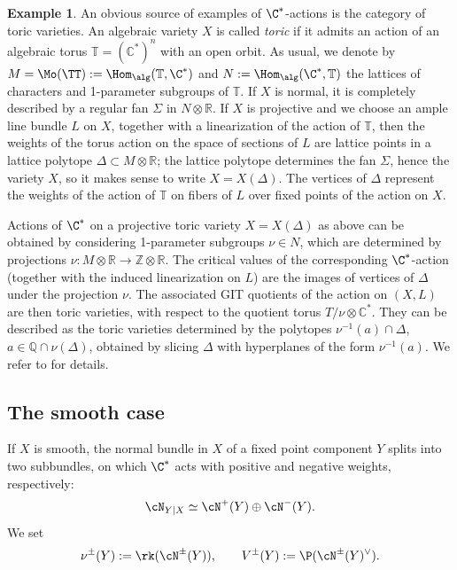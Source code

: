 \documentclass[reqno]{amsproc}
\theoremstyle{definition}
\newtheorem{example}[theorem]{Example}
\begin{document}
\begin{example}\label{wors6:ex:toric}
An obvious source of examples of $\C^*$-actions is the category of toric varieties. An algebraic variety $X$ is called {\em toric} if it admits an action of an algebraic torus $\mathbb{T}=(\mathbb{C}^*)^n$ with an open orbit. As usual, we denote by $M=\Mo(\TT):=\Hom_{\alg}(\mathbb{T},\C^*)$ and $N:=\Hom_{\alg}(\C^*,\mathbb{T})$ the lattices of characters and 1-parameter subgroups of $\mathbb{T}$. If $X$ is normal, it is completely described by a regular fan $\Sigma$ in $N\otimes\mathbb{R}$.  
If $X$ is projective and we choose an ample line bundle $L$ on $X$, together with a linearization of the action of $\mathbb{T}$, then the weights of the torus action on the space of sections of $L$ are lattice points in a lattice polytope $\Delta\subset M\otimes\mathbb{R}$; the lattice polytope determines the fan $\Sigma$, hence the variety $X$, so it makes sense to write $X=X(\Delta)$. The vertices of $\Delta$ represent the weights of the action of $\mathbb{T}$ on fibers of $L$ over fixed points of the action on $X$. 
  
Actions of $\C^*$ on a projective toric variety $X=X(\Delta)$ as above can be  obtained by considering 1-parameter subgroups $\nu\in N$, which are determined by projections $\nu: M\otimes\mathbb{R}\rightarrow\mathbb{Z}\otimes\mathbb{R}$. The critical values of the corresponding $\C^*$-action (together with the induced linearization on $L$) are the images of vertices of $\Delta$ under the projection $\nu$. The associated GIT quotients of the action on $(X,L)$ are then toric varieties, with respect to the quotient torus $T/\nu\otimes\mathbb{C}^*$. They can be described as the toric varieties determined by the polytopes $\nu^{-1}(a)\cap\Delta$, $a\in\mathbb{Q}\cap\nu(\Delta)$, obtained by slicing $\Delta$ with hyperplanes of the form $\nu^{-1}(a)$. We refer to \cite{wors6-KSZ} for details.
\end{example}


\subsection{The smooth case}\label{wors6:sssec:BBsmooth}
If $X$ is smooth, the normal bundle in $X$ of a fixed point component $Y$  splits into two subbundles, on which $\C^*$ acts with positive and negative weights, respectively:
\begin{equation}
\cN_{Y|X}\simeq \cN^+(Y)\oplus \cN^-(Y).
\label{wors6:eq:normal+-}
\end{equation}
We set
\begin{equation}\label{wors6:eq:Vpm}
\nu^{\pm}(Y):=\rk (\cN^{\pm}(Y)), \qquad 
V^\pm(Y):=\P(\cN^{\pm}(Y)^\vee).
\end{equation}
\end{document}
